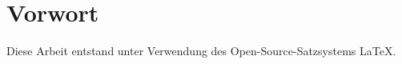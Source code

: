 \chapter{Vorwort}




{\scriptsize Diese Arbeit entstand unter Verwendung des Open-Source-Satzsystems \LaTeX{}.}